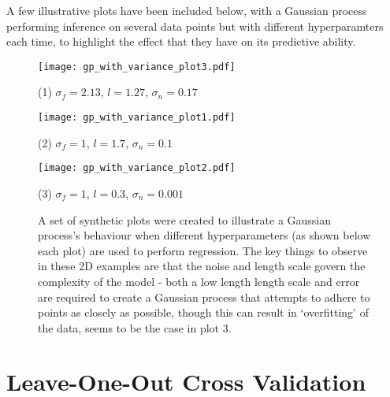 %  

A few illustrative plots have been included below, with a Gaussian process performing inference on several data points but with different hyperparamters each time, to highlight the effect that they have on its predictive ability.

\begin{figure}
    \centering
    \begin{minipage}{0.53\linewidth}
        \texttt{[image: gp\_with\_variance\_plot3.pdf]}
        \caption*{(1) $\sigma_f = 2.13$, $l = 1.27$, $\sigma_n = 0.17$}
    \end{minipage}
    \hfill
    \begin{minipage}{0.47\linewidth}
        \texttt{[image: gp\_with\_variance\_plot1.pdf]}
        \caption*{(2) $\sigma_f = 1$, $l = 1.7$, $\sigma_n = 0.1$}
    \end{minipage}
    \begin{minipage}{0.47\linewidth}
        \texttt{[image: gp\_with\_variance\_plot2.pdf]}
        \caption*{(3) $\sigma_f = 1$, $l = 0.3$, $\sigma_n = 0.001$}
    \end{minipage}
    \label{fig:gptoyplots}
    \caption{A set of synthetic plots were created to illustrate a Gaussian process's behaviour when different hyperparameters (as shown below each plot) are used to perform regression. The key things to observe in these 2D examples are that the noise and length scale govern the complexity of the model - both a low length length scale and error are required to create a Gaussian process that attempts to adhere to points as closely as possible, though this can result in `overfitting' of the data, seems to be the case in plot 3.}
\end{figure}

\section{Leave-One-Out Cross Validation}


